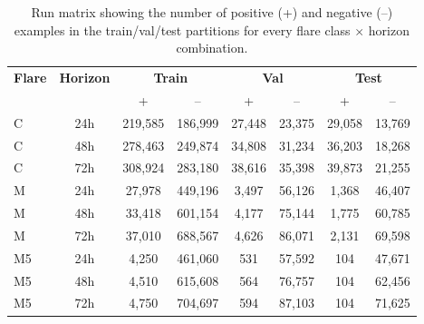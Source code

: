 
\begin{table}[ht]\centering
\caption{Run matrix showing the number of positive (+) and negative (--) examples in the train/val/test partitions for every flare class $\times$ horizon combination.}
\label{tab:run_matrix}
\begin{tabular}{lccccccc}
\toprule
\multirow{2}{*}{\textbf{Flare}} & \multirow{2}{*}{\textbf{Horizon}} &
\multicolumn{2}{c}{\textbf{Train}} & \multicolumn{2}{c}{\textbf{Val}} &
\multicolumn{2}{c}{\textbf{Test}}\\
& & + & -- & + & -- & + & -- \\
\midrule
C & 24h & 219,585 & 186,999 & 27,448 & 23,375 & 29,058 & 13,769 \\
C & 48h & 278,463 & 249,874 & 34,808 & 31,234 & 36,203 & 18,268 \\
C & 72h & 308,924 & 283,180 & 38,616 & 35,398 & 39,873 & 21,255 \\
M & 24h & 27,978 & 449,196 & 3,497 & 56,126 & 1,368 & 46,407 \\
M & 48h & 33,418 & 601,154 & 4,177 & 75,144 & 1,775 & 60,785 \\
M & 72h & 37,010 & 688,567 & 4,626 & 86,071 & 2,131 & 69,598 \\
M5 & 24h & 4,250 & 461,060 & 531 & 57,592 & 104 & 47,671 \\
M5 & 48h & 4,510 & 615,608 & 564 & 76,757 & 104 & 62,456 \\
M5 & 72h & 4,750 & 704,697 & 594 & 87,103 & 104 & 71,625 \\

\bottomrule
\end{tabular}
\end{table}
